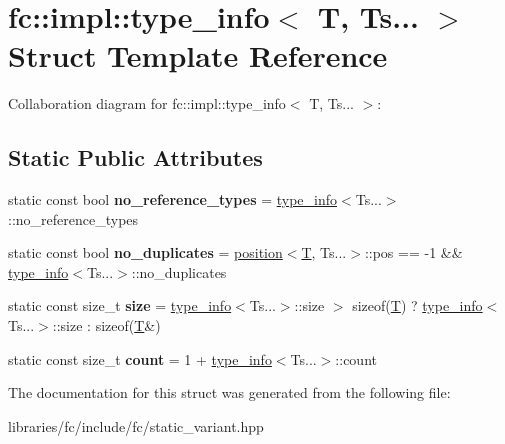 \hypertarget{structfc_1_1impl_1_1type__info_3_01_t_00_01_ts_8_8_8_01_4}{}\section{fc\+:\+:impl\+:\+:type\+\_\+info$<$ T, Ts... $>$ Struct Template Reference}
\label{structfc_1_1impl_1_1type__info_3_01_t_00_01_ts_8_8_8_01_4}


Collaboration diagram for fc\+:\+:impl\+:\+:type\+\_\+info$<$ T, Ts... $>$\+:
\subsection*{Static Public Attributes}
\begin{DoxyCompactItemize}
\item 
\mbox{\label{structfc_1_1impl_1_1type__info_3_01_t_00_01_ts_8_8_8_01_4_aabfb9674123c0dc1be8ce8057018012d}} 
static const bool {\bfseries no\+\_\+reference\+\_\+types} = \mbox{\hyperlink{structfc_1_1impl_1_1type__info}{type\+\_\+info}}$<$Ts...$>$\+::no\+\_\+reference\+\_\+types
\item 
\mbox{\label{structfc_1_1impl_1_1type__info_3_01_t_00_01_ts_8_8_8_01_4_aac9d40ced06b79c6d162941cb80283a5}} 
static const bool {\bfseries no\+\_\+duplicates} = \mbox{\hyperlink{structfc_1_1impl_1_1position}{position}}$<$\mbox{\hyperlink{struct_t}{T}}, Ts...$>$\+::pos == -\/1 \&\& \mbox{\hyperlink{structfc_1_1impl_1_1type__info}{type\+\_\+info}}$<$Ts...$>$\+::no\+\_\+duplicates
\item 
\mbox{\label{structfc_1_1impl_1_1type__info_3_01_t_00_01_ts_8_8_8_01_4_a924c507f7b713ab9453f7839d8faaf39}} 
static const size\+\_\+t {\bfseries size} = \mbox{\hyperlink{structfc_1_1impl_1_1type__info}{type\+\_\+info}}$<$Ts...$>$\+::size $>$ sizeof(\mbox{\hyperlink{struct_t}{T}}) ? \mbox{\hyperlink{structfc_1_1impl_1_1type__info}{type\+\_\+info}}$<$Ts...$>$\+::size \+: sizeof(\mbox{\hyperlink{struct_t}{T}}\&)
\item 
\mbox{\label{structfc_1_1impl_1_1type__info_3_01_t_00_01_ts_8_8_8_01_4_a688235d51c659a29ac98c36e8c497f1e}} 
static const size\+\_\+t {\bfseries count} = 1 + \mbox{\hyperlink{structfc_1_1impl_1_1type__info}{type\+\_\+info}}$<$Ts...$>$\+::count
\end{DoxyCompactItemize}


The documentation for this struct was generated from the following file\+:\begin{DoxyCompactItemize}
\item 
libraries/fc/include/fc/static\+\_\+variant.\+hpp\end{DoxyCompactItemize}
